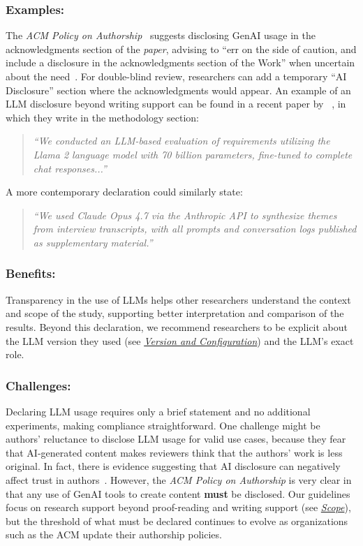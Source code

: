 \documentclass[smallextended]{svjour3}
\newcommand{\must}{\textbf{must}\xspace}
\newcommand{\paper}{\emph{paper}\xspace}
\newcommand{\paper}{\emph{paper}\xspace}
\newcommand{\scope}{\hyperref[sec:scope]{\emph{Scope}}\xspace}
\newcommand{\scope}{\href{/scope/}{\emph{Scope}}\xspace}
\newcommand{\modelversion}{\hyperref[sec:report-model-version-configuration-and-customizations]{\emph{Version and Configuration}}\xspace}
\newcommand{\modelversion}{\href{/guidelines\#report-model-version-configuration-and-customizations}{\emph{Version and Configuration}}\xspace}
\newcommand{\guidelinesubsubsection}[1]{\subsubsection{\bfseries #1:}}
\newcommand{\guidelinesubsubsection}[1]{\subsubsection{#1}}
\begin{document}
\guidelinesubsubsection{Examples}

The \emph{ACM Policy on Authorship}~\cite{ACM2023} suggests disclosing GenAI usage in the acknowledgments section of the \paper, advising to ``err on the side of caution, and include a disclosure in the acknowledgments section of the Work'' when uncertain about the need~\cite{ACM2023}.
For double-blind review, researchers can add a temporary ``AI Disclosure'' section where the acknowledgments would appear.
An example of an LLM disclosure beyond writing support can be found in a recent paper by \citeauthor{DBLP:conf/re/LubosFTGMEL24}~\cite{DBLP:conf/re/LubosFTGMEL24}, in which they write in the methodology section:

\begin{quote}
\it
``We conducted an LLM-based evaluation of requirements utilizing the Llama 2 language model with 70 billion parameters, fine-tuned to complete chat responses...''
\end{quote}

\noindent A more contemporary declaration could similarly state:

\begin{quote}
\it
``We used Claude Opus 4.7 via the Anthropic API to synthesize themes from interview transcripts, with all prompts and conversation logs published as supplementary material.''
\end{quote}

\guidelinesubsubsection{Benefits}

Transparency in the use of LLMs helps other researchers understand the context and scope of the study, supporting better interpretation and comparison of the results.
Beyond this declaration, we recommend researchers to be explicit about the LLM version they used (see \modelversion) and the LLM's exact role.

\guidelinesubsubsection{Challenges}

Declaring LLM usage requires only a brief statement and no additional experiments, making compliance straightforward.
One challenge might be authors' reluctance to disclose LLM usage for valid use cases, because they fear that AI-generated content makes reviewers think that the authors' work is less original.
In fact, there is evidence suggesting that AI disclosure can negatively affect trust in authors~\cite{SCHILKE2025104405}.
However, the \emph{ACM Policy on Authorship} is very clear in that any use of GenAI tools to create content \must be disclosed.
Our guidelines focus on research support beyond proof-reading and writing support (see \scope), but the threshold of what must be declared continues to evolve as organizations such as the ACM update their authorship policies.
\end{document}
